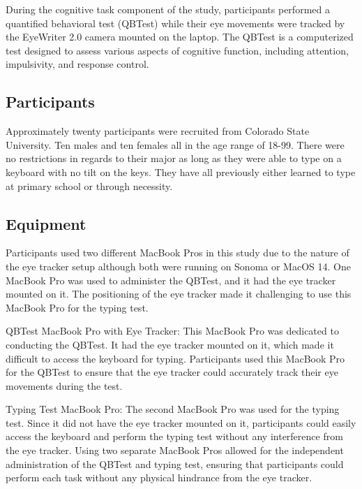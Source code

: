\documentclass[manuscript, screen, review]{acmart} %
\begin{document}
During the cognitive task component of the study, participants performed a quantified behavioral test (QBTest) while their eye movements were tracked by the EyeWriter 2.0 camera mounted on the laptop. The QBTest is a computerized test designed to assess various aspects of cognitive function, including attention, impulsivity, and response control.

\subsection[short]{Participants}
Approximately twenty participants were recruited from Colorado State University. Ten males and ten females all in the age range of 18-99. There were no %
restrictions in regards to their major as long as they were able to type on a keyboard with no tilt on the keys.
They have all previously either learned to type at primary school or through necessity.

\subsection[short]{Equipment}  %
Participants used two different MacBook Pros in this study due to the nature of the eye tracker setup although both were running on Sonoma or MacOS 14. One MacBook Pro was used to administer the QBTest, and it had the eye tracker mounted on it. The positioning of the eye tracker made it challenging to use this MacBook Pro for the typing test. 

QBTest MacBook Pro with Eye Tracker: This MacBook Pro was dedicated to conducting the QBTest. It had the eye tracker mounted on it, which made it difficult to access the keyboard for typing. Participants used this MacBook Pro for the QBTest to ensure that the eye tracker could accurately track their eye movements during the test.

Typing Test MacBook Pro: The second MacBook Pro was used for the typing test. Since it did not have the eye tracker mounted on it, participants could easily access the keyboard and perform the typing test without any interference from the eye tracker.
Using two separate MacBook Pros allowed for the independent administration of the QBTest and typing test, ensuring that participants could perform each task without any physical hindrance from the eye tracker.
\end{document}
